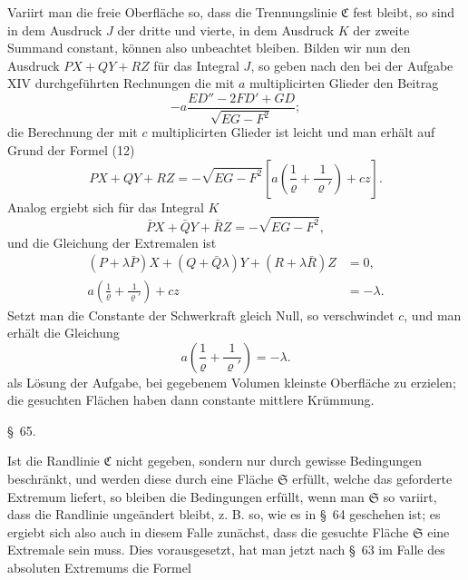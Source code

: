 \documentclass[11pt,a4paper,leqno]{article}
\begin{document}
Variirt man die freie Oberfläche so, dass die Trennungslinie
$\mathfrak{C}$ fest bleibt, so sind in dem Ausdruck $J$ der dritte und
vierte, in dem Ausdruck $K$ der zweite Summand constant, können
also unbeachtet bleiben. Bilden wir nun den Ausdruck $PX+QY+RZ$
für das Integral $J$, so geben nach den bei der Aufgabe XIV
durchgeführten Rechnungen die mit $a$ multiplicirten Glieder den
Beitrag
\[
-a\frac{ED''-2FD'+GD}{\sqrt{EG-F^2}};
\]
die Berechnung der mit $c$ multiplicirten Glieder ist leicht und
man erhält auf Grund der Formel (12)
\[
PX+QY+RZ=-\sqrt{EG-F^2}
\left[a\left(\frac{1}{\varrho}+\frac{1}{\varrho'}\right)+cz\right].
\]
Analog ergiebt sich für das Integral $K$
\[
\bar PX+\bar QY+\bar RZ=-\sqrt{EG-F^2},
\]
und die Gleichung der Extremalen ist
\[
\begin{aligned}
(P+\lambda\bar P)X+(Q+\bar Q\lambda)Y+(R+\lambda\bar R)Z&=0,\\
a\left(\frac{1}{\varrho}+\frac{1}{\varrho'}\right)+cz&=-\lambda.
\end{aligned}
\]
Setzt man die Constante der Schwerkraft gleich Null, so
verschwindet $c$, und man erhält die Gleichung
\[
a\left(\frac{1}{\varrho}+\frac{1}{\varrho'}\right)=-\lambda.
\]
als Lösung der Aufgabe, bei gegebenem Volumen kleinste Oberfläche
zu erzielen; die gesuchten Flächen haben dann constante
mittlere Krümmung.


\begin{center}
{\large \S~65.}
\end{center}

Ist die Randlinie $\mathfrak{C}$ nicht gegeben, sondern nur durch gewisse
Bedingungen beschränkt, und werden diese durch eine Fläche $\mathfrak{S}$
erfüllt, welche das geforderte Extremum liefert, so bleiben die Bedingungen
erfüllt, wenn man $\mathfrak{S}$ so variirt, dass die Randlinie ungeändert
bleibt, z. B. so, wie es in \S~64 geschehen ist; es ergiebt sich also auch in
diesem Falle zunächst, dass die gesuchte Fläche $\mathfrak{S}$ eine Extremale
sein muss. Dies vorausgesetzt, hat man jetzt nach \S~63 im Falle des absoluten
Extremums die Formel
\end{document}
